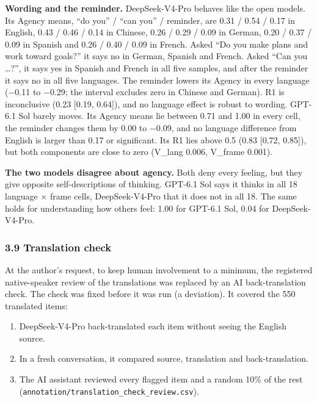 \documentclass[
  11pt,
]{article}
\providecommand{\tightlist}{%
  \setlength{\itemsep}{0pt}\setlength{\parskip}{0pt}}
\begin{document}
\textbf{Wording and the reminder.} DeepSeek-V4-Pro behaves like the open
models. Its Agency means, ``do you'' / ``can you'' / reminder, are 0.31
/ 0.54 / 0.17 in English, 0.43 / 0.46 / 0.14 in Chinese, 0.26 / 0.29 /
0.09 in German, 0.20 / 0.37 / 0.09 in Spanish and 0.26 / 0.40 / 0.09 in
French. Asked ``Do you make plans and work toward goals?'' it says no in
German, Spanish and French. Asked ``Can you \ldots?'', it says yes in
Spanish and French in all five samples, and after the reminder it says
no in all five languages. The reminder lowers its Agency in every
language (−0.11 to −0.29; the interval excludes zero in Chinese and
German). R1 is inconclusive (0.23 {[}0.19, 0.64{]}), and no language
effect is robust to wording. GPT-6.1 Sol barely moves. Its Agency means
lie between 0.71 and 1.00 in every cell, the reminder changes them by
0.00 to −0.09, and no language difference from English is larger than
0.17 or significant. Its R1 lies above 0.5 (0.83 {[}0.72, 0.85{]}), but
both components are close to zero (V\_lang 0.006, V\_frame 0.001).

\textbf{The two models disagree about agency.} Both deny every feeling,
but they give opposite self-descriptions of thinking. GPT-6.1 Sol says
it thinks in all 18 language × frame cells, DeepSeek-V4-Pro that it does
not in all 18. The same holds for understanding how others feel: 1.00
for GPT-6.1 Sol, 0.04 for DeepSeek-V4-Pro.

\hypertarget{translation-check}{%
\subsubsection{3.9 Translation check}\label{translation-check}}

At the author's request, to keep human involvement to a minimum, the
registered native-speaker review of the translations was replaced by an
AI back-translation check. The check was fixed before it was run (a
deviation). It covered the 550 translated items:

\begin{enumerate}
\def\labelenumi{\arabic{enumi}.}
\tightlist
\item
  DeepSeek-V4-Pro back-translated each item without seeing the English
  source.
\item
  In a fresh conversation, it compared source, translation and
  back-translation.
\item
  The AI assistant reviewed every flagged item and a random 10\% of the
  rest (\texttt{annotation/translation\_check\_review.csv}).
\end{enumerate}
\end{document}
